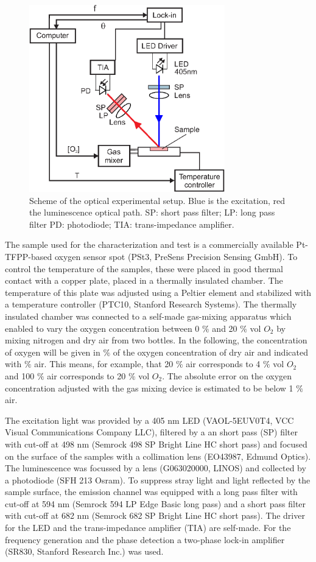 \documentclass[9pt,twocolumn,twoside,pdftex]{optica}
\begin{document}
\begin{figure}[htbp]
\centering
\includegraphics[keepaspectratio, width=8.5cm]{setup_auto.eps}
\caption{Scheme of the optical experimental setup. Blue is the excitation, red the luminescence optical path. SP: short pass filter; LP: long pass filter PD: photodiode; TIA: trans-impedance amplifier.}
\label{fig:setup}
\end{figure}

The sample used for the characterization and test is a commercially available Pt-TFPP-based oxygen sensor spot (PSt3, PreSens Precision Sensing GmbH).
To control the temperature of the samples, these were placed in good thermal contact with a copper plate, placed in a thermally insulated chamber. The temperature of this plate was adjusted using a Peltier element and stabilized with a temperature controller (PTC10, Stanford Research Systems). The thermally insulated chamber was connected to a self-made gas-mixing apparatus which enabled to vary the oxygen concentration between 0 $\%$ and 20 $\%$ vol $O_2$ by mixing nitrogen and dry air from two bottles. In the following, the concentration of oxygen will be given in $\%$ of the oxygen concentration of dry air and indicated with $\%$ air. This means, for example, that 20 $\%$ air corresponds to 4 $\%$ vol $O_2$ and 100 $\%$ air corresponds to 20 $\%$ vol $O_2$. The absolute error on the oxygen concentration adjusted with the gas mixing device is estimated to be below 1 $\%$ air. 
 
The excitation light was provided by a 405 nm LED (VAOL-5EUV0T4, VCC Visual Communications Company LLC), filtered by a an short pass (SP) filter with cut-off at 498 nm (Semrock 498 SP Bright Line HC short pass) and focused on the surface of the samples with a collimation lens (EO43987, Edmund Optics). The luminescence was focussed by a lens (G063020000, LINOS) and collected by a photodiode (SFH 213 Osram).
To suppress stray light and light reflected by the sample surface, the emission channel was equipped with a long pass filter with cut-off at 594 nm (Semrock 594 LP Edge Basic long pass) and a short pass filter with cut-off at 682 nm (Semrock 682 SP Bright Line HC short pass). The driver for the LED and the trans-impedance amplifier (TIA) are self-made.
For the frequency generation and the phase detection a two-phase lock-in amplifier (SR830, Stanford Research Inc.) was used. 
\end{document}
